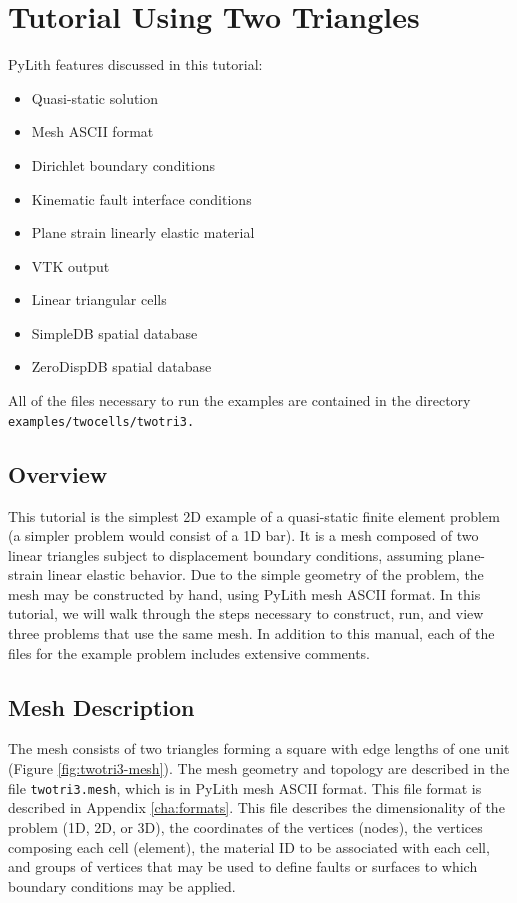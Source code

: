 
\section{\label{sec:Tutorial-Two-triangle}Tutorial Using Two Triangles}

PyLith features discussed in this tutorial:
\begin{itemize}
\item Quasi-static solution
\item Mesh ASCII format
\item Dirichlet boundary conditions
\item Kinematic fault interface conditions
\item Plane strain linearly elastic material
\item VTK output
\item Linear triangular cells
\item SimpleDB spatial database
\item ZeroDispDB spatial database
\end{itemize}
All of the files necessary to run the examples are contained in the
directory \texttt{examples/twocells/twotri3.}


\subsection{Overview}

This tutorial is the simplest 2D example of a quasi-static finite
element problem (a simpler problem would consist of a 1D bar). It
is a mesh composed of two linear triangles subject to displacement
boundary conditions, assuming plane-strain linear elastic behavior.
Due to the simple geometry of the problem, the mesh may be constructed
by hand, using PyLith mesh ASCII format. In this tutorial, we will
walk through the steps necessary to construct, run, and view three
problems that use the same mesh. In addition to this manual, each
of the files for the example problem includes extensive comments.


\subsection{Mesh Description}

The mesh consists of two triangles forming a square with edge lengths
of one unit (Figure \vref{fig:twotri3-mesh}). The mesh geometry and
topology are described in the file \texttt{twotri3.mesh}, which is
in PyLith mesh ASCII format. This file format is described in Appendix
\vref{cha:formats}. This file describes the dimensionality of
the problem (1D, 2D, or 3D), the coordinates of the vertices (nodes),
the vertices composing each cell (element), the material ID to be
associated with each cell, and groups of vertices that may be used
to define faults or surfaces to which boundary conditions may be applied.

